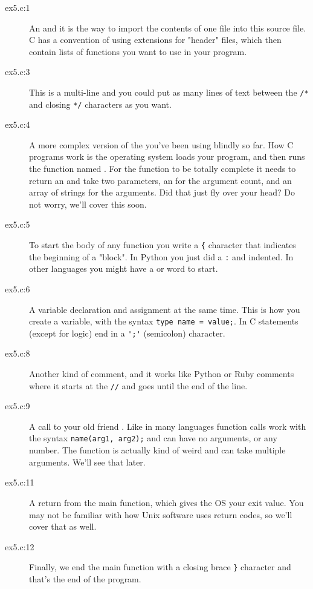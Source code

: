 \begin{description}
\item[ex5.c:1] An  and it is the way to import the contents
    of one file into this source file.  C has a convention of using 
     extensions for "header" files, which then contain lists
    of functions you want to use in your program.
\item[ex5.c:3] This is a multi-line  and you could put as many
    lines of text between the \verb|/*| and closing \verb|*/| characters as you want.
\item[ex5.c:4] A more complex version of the  you've
    been using blindly so far.  How C programs work is the operating system
    loads your program, and then runs the function named .
    For the function to be totally complete it needs to return an 
    and take two parameters, an  for the argument count, and
    an array of  strings for the arguments.  Did that
    just fly over your head?  Do not worry, we'll cover this soon.
\item[ex5.c:5] To start the body of any function you write a \verb|{| character
    that indicates the beginning of a "block".  In Python you just
    did a \verb|:| and indented. In other languages you might have a
     or  word to start.
\item[ex5.c:6] A variable declaration and assignment at the same time.
    This is how you create a variable, with the syntax \verb|type name = value;|.
    In C statements (except for logic) end in a \verb|';'| (semicolon) character.
\item[ex5.c:8] Another kind of comment, and it works like Python or
    Ruby comments where it starts at the \verb|//| and goes until the end of
    the line.
\item[ex5.c:9] A call to your old friend .  Like in many languages
    function calls work with the syntax \verb|name(arg1, arg2);| and can have
    no arguments, or any number.  The  function is actually
    kind of weird and can take multiple arguments. We'll see that later.
\item[ex5.c:11] A return from the main function, which gives the OS your exit
    value.  You may not be familiar with how Unix software uses return
    codes, so we'll cover that as well.
\item[ex5.c:12] Finally, we end the main function with a closing brace \verb|}|
    character and that's the end of the program.
\end{description}

